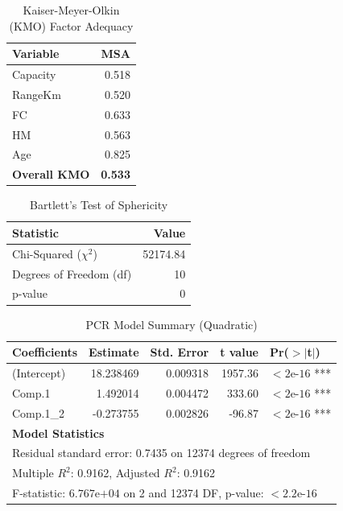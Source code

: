 \FloatBarrier

\begin{table}[htbp]
  \centering
  \begin{tabular}{lr}
    \toprule
    \textbf{Variable} & \textbf{MSA} \\
    \midrule
    Capacity & 0.518 \\
    RangeKm  & 0.520 \\
    FC       & 0.633 \\
    HM       & 0.563 \\
    Age      & 0.825 \\
    \midrule
    \textbf{Overall KMO} & \textbf{0.533} \\
    \bottomrule
  \end{tabular}
  \caption{Kaiser-Meyer-Olkin (KMO) Factor Adequacy}
  \label{tab:q4_06}
\end{table}

\FloatBarrier

\begin{table}[htbp]
  \centering
  \begin{tabular}{lr}
    \toprule
    \textbf{Statistic} & \textbf{Value} \\
    \midrule
    Chi-Squared ($\chi^2$)  & 52174.84 \\
    Degrees of Freedom (df) & 10 \\
    p-value                 & 0 \\
    \bottomrule
  \end{tabular}
  \caption{Bartlett's Test of Sphericity}
  \label{tab:q4_07}
\end{table}

\FloatBarrier

\begin{table}[htbp]
    \centering
    \begin{tabular}{l r r r l}
        \hline
        \textbf{Coefficients} & \textbf{Estimate} & \textbf{Std. Error} & \textbf{t value} & \textbf{Pr($>$$|$t$|$)} \\ 
        \hline
        (Intercept) & 18.238469 & 0.009318 & 1957.36 & $< 2\text{e-}16$ *** \\
        Comp.1      &  1.492014 & 0.004472 &  333.60 & $< 2\text{e-}16$ *** \\
        Comp.1\_2   & -0.273755 & 0.002826 &  -96.87 & $< 2\text{e-}16$ *** \\
        \hline
        \multicolumn{5}{l}{\textbf{Model Statistics}} \\
        \multicolumn{5}{l}{Residual standard error: 0.7435 on 12374 degrees of freedom} \\
        \multicolumn{5}{l}{Multiple $R^2$: 0.9162, \quad Adjusted $R^2$: 0.9162} \\
        \multicolumn{5}{l}{F-statistic: $6.767\text{e+}04$ on 2 and 12374 DF, \quad p-value: $< 2.2\text{e-}16$} \\
        \hline
    \end{tabular}
    \caption{PCR Model Summary (Quadratic)}
    \label{tab:q4_09}
\end{table}

